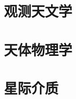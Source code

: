 \documentclass[UTF8]{NatureUniverse}
\begin{document}
\section{观测天文学}
\section{天体物理学}
\section{星际介质}
\end{document}
